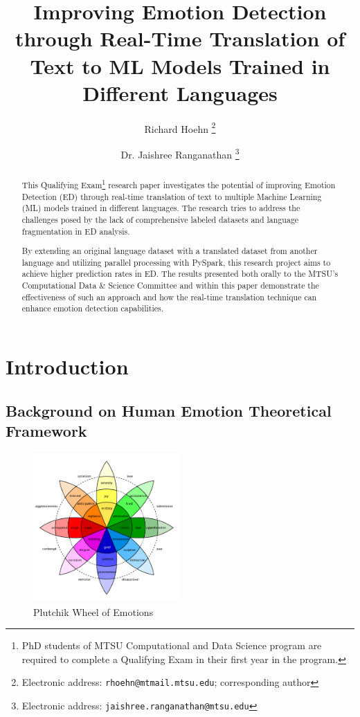 \documentclass[11pt]{article}
\title{Improving Emotion Detection through Real-Time Translation of Text to ML Models Trained in Different Languages}
\author{Richard Hoehn%
	\thanks{Electronic address: \texttt{rhoehn@mtmail.mtsu.edu}; corresponding author}}
\affil{Middle Tennessee State University}
\author{Dr. Jaishree Ranganathan%
	\thanks{Electronic address: \texttt{jaishree.ranganathan@mtsu.edu}}}
\affil{Middle Tennessee State University}
\begin{document}
\maketitle

\begin{abstract}
This Qualifying Exam\footnote{PhD students of MTSU Computational and Data  Science program are required to complete a Qualifying Exam in their first year in the program.} research paper investigates the potential of improving Emotion Detection (ED) through real-time translation of text to multiple Machine Learning (ML) models trained in different languages. The research tries to address the challenges posed by the lack of comprehensive labeled datasets and language fragmentation in ED analysis.

By extending an original language dataset with a translated dataset from another language and utilizing parallel processing with PySpark, this research project aims to achieve higher prediction rates in ED. The results presented both orally to the MTSU's Computational Data \& Science Committee and within this paper demonstrate the effectiveness of such an approach and how the real-time translation technique can enhance emotion detection capabilities.
\end{abstract}
\clearpage

\tableofcontents
\clearpage

\section{Introduction}
\subsection{Background on Human Emotion Theoretical Framework}

\begin{figure} %
    \centering
    \includegraphics[width=0.5\textwidth]{Plutchik-Wheel}
    \caption{Plutchik Wheel of Emotions}
    \label{fig:plutchik-wheel}
\end{figure}
\end{document}
